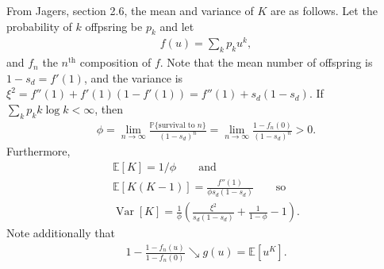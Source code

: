 \documentclass{article}
\newcommand{\E}{\mathbb{E}}
\renewcommand{\P}{\mathbb{P}}
\newcommand{\var}{\mathop{\mbox{Var}}}
\begin{document}
From Jagers, section 2.6,
the mean and variance of $K$ are as follows.
Let the probability of $k$ offpsring be $p_k$ and let
\begin{align}
 f(u) =  \sum_k p_k u^k,
\end{align}
and $f_n$ the $n^\mathrm{th}$ composition of $f$.
Note that the mean number of offspring is $1-s_d = f'(1)$, and the variance is $\xi^2 = f''(1) + f'(1)(1-f'(1)) = f''(1) + s_d(1-s_d)$.
If $\sum_k p_k k \log k < \infty$, then 
\begin{align}
\phi = \lim_{n \to \infty} \frac{ \P\{ \mbox{survival to }n \}  }{ (1-s_d)^n } = \lim_{n \to \infty} \frac{ 1-f_n(0) }{ (1-s_d)^n } > 0 .
\end{align}
Furthermore,
\begin{gather*}
\E[K] = 1/\phi \qquad \mbox{and} \\
\E[K(K-1)] = \frac{ f''(1) }{ \phi s_d (1-s_d) } \qquad \mbox{so} \\
\var[K] = \frac{1}{\phi} \left( \frac{ \xi^2 }{ s_d (1-s_d) } + \frac{1}{1-\phi} - 1 \right) .
\end{gather*}
Note additionally that 
\begin{align}
    1 - \frac{1-f_n(u)}{1-f_n(0)} \searrow g(u) = \E[u^K] .
\end{align}
\end{document}

